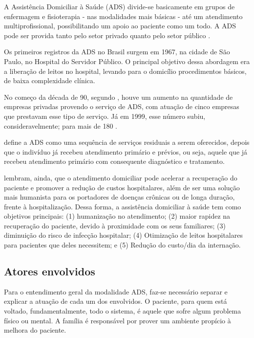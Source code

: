 A Assistência Domiciliar à Saúde (ADS) divide-se basicamente em grupos de
enfermagem e fisioterapia - nas modalidades mais básicas - até um atendimento
multiprofissional, possibilitando um apoio ao paciente como um todo. A ADS pode
ser provida tanto pelo setor privado quanto pelo setor público
\cite{amaral2001assistencia}.

Os primeiros registros da ADS no Brasil surgem em 1967, na cidade de São
Paulo, no Hospital do Servidor Público. O principal objetivo dessa abordagem
era a liberação de leitos no hospital, levando para o domicílio procedimentos
básicos, de baixa complexidade clínica.

No começo da década de 90, segundo ,
houve um aumento na quantidade de empresas privadas provendo o serviço de ADS,
com atuação de cinco empresas que prestavam esse tipo de  serviço. Já em 1999,
esse número subiu, consideravelmente; para mais de 180
\cite{tavolari2000desenvolvimento}.

 define a ADS como uma sequência de serviços
residuais a serem oferecidos, depois que o indivíduo já recebeu atendimento
primário e prévios, ou seja, aquele que já recebeu atendimento primário com
consequente diagnóstico e tratamento.

 lembram, ainda, que o atendimento domiciliar
pode acelerar a recuperação do  paciente e promover a redução de custos
hospitalares, além de ser uma solução mais  humanista para os portadores de
doenças crônicas ou de longa duração, frente à  hospitalização. Dessa forma, a
assistência domiciliar à saúde tem como objetivos principais: (1) humanização
no atendimento; (2) maior rapidez na recuperação do paciente, devido à
proximidade com os seus familiares; (3) diminuição do risco de infecção
hospitalar; (4) Otimização de leitos hospitalares para pacientes que deles
necessitem; e (5) Redução do custo/dia da internação.

\subsection{Atores envolvidos}\label{subsec:envolvidos}

Para o entendimento geral da modalidade ADS, faz-se necessário separar e
explicar a atuação de cada um dos envolvidos. O paciente, para quem está
voltado, fundamentalmente, todo o sistema, é aquele que sofre algum problema
físico ou mental. A família é responsável por prover um ambiente propício à
melhora do paciente.

